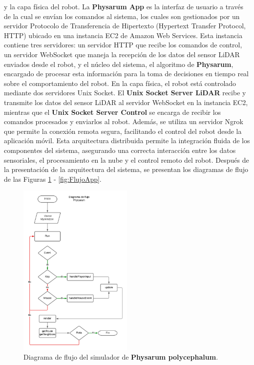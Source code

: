         y la capa f\'isica del robot.
        \vskip 0.5cm
        La \textbf{Physarum App} es la interfaz de usuario a trav\'es de la cual se env\'ian los comandos al sistema, 
        los cuales son gestionados por un servidor Protocolo de Transferencia de Hipertexto (Hypertext Transfer Protocol, HTTP) ubicado en una instancia EC2 de Amazon Web Services. Esta instancia 
        contiene tres servidores: un servidor HTTP que recibe los comandos de control, un servidor WebSocket que maneja la 
        recepci\'on de los datos del sensor LiDAR enviados desde el robot, y el n\'ucleo del sistema, el algoritmo de \textbf{Physarum},
        encargado de procesar esta informaci\'on para la toma de decisiones en tiempo real sobre el comportamiento del robot.
        \vskip 0.5cm
        En la capa f\'isica, el robot est\'a controlado 
        mediante dos servidores Unix Socket. El \textbf{Unix Socket Server LiDAR} recibe 
        y transmite los datos del sensor LiDAR al servidor WebSocket en la instancia EC2, 
        mientras que el \textbf{Unix Socket Server Control} se encarga de recibir los comandos procesados y enviarlos al robot. 
        Adem\'as, se utiliza un servidor Ngrok que permite la conexi\'on remota segura, facilitando el control del robot desde 
        la aplicaci\'on m\'ovil.
        \vskip 0.5cm
        Esta arquitectura distribuida permite la integraci\'on fluida de los componentes del sistema, 
        asegurando una correcta interacci\'on entre los datos sensoriales, el procesamiento en la nube y el control 
        remoto del robot.
        \vskip 0.5cm
        Despu\'es de la presentaci\'on de la arquitectura del sistema, se presentan los diagramas de flujo de las Figuras
        \ref{fig:FlujoSimulador} - \ref{fig:FlujoApp}.
        \vskip 0.5cm
            \begin{figure}[htbp]
                \centering
                \includegraphics[width=0.5\textwidth]{images/desarrollo/diagramas/FlujoSim.png}
                \caption{Diagrama de flujo del simulador de \textbf{Physarum polycephalum}.}
                \label{fig:FlujoSimulador}
            \end{figure}
        \vskip 0.5cm

